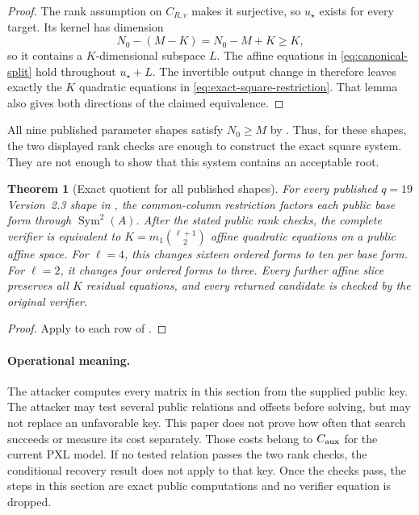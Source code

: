 \documentclass[11pt]{article}
\newtheorem{theorem}{Theorem}[section]
\newcommand{\Sym}{\operatorname{Sym}}
\begin{document}
\begin{proof}
The rank assumption on $C_{R,v}$ makes it surjective, so $u_\star$ exists for
every target.  Its kernel has dimension
\[
  N_0-(M-K)=N_0-M+K\ge K,
\]
so it contains a $K$-dimensional subspace $L$.  The affine equations in
\eqref{eq:canonical-split} hold throughout $u_\star+L$.  The invertible output
change in  therefore leaves exactly the $K$
quadratic equations in \eqref{eq:exact-square-restriction}.  That lemma also
gives both directions of the claimed equivalence.
\end{proof}

All nine published parameter shapes satisfy $N_0\ge M$ by
.  Thus, for these shapes, the two displayed rank checks
are enough to construct the exact square system.  They are not enough to show
that this system contains an acceptable root.

\begin{theorem}[Exact quotient for all published shapes]
\label{thm:exact-all-nine}
For every published $q=19$ Version~2.3 shape in , the
common-column restriction factors each public base form through
$\Sym^2(A)$.  After the stated public rank checks, the complete verifier is
equivalent to $K=m_1\binom{\ell+1}{2}$ affine quadratic equations on a public
affine space.  For $\ell=4$, this changes sixteen ordered forms to ten per
base form.  For $\ell=2$, it changes four ordered forms to three.  Every
further affine slice preserves all $K$ residual equations, and every returned
candidate is checked by the original verifier.
\end{theorem}

\begin{proof}
Apply 
to each row of .
\end{proof}

\paragraph{Operational meaning.}
The attacker computes every matrix in this section from the supplied public
key.  The attacker may test several public relations and offsets before
solving, but may not replace an unfavorable key.  This paper does not prove
how often that search succeeds or measure its cost separately.  Those costs
belong to $C_{\rm aux}$ for the current PXL model.  If no tested relation
passes the two rank checks, the conditional recovery result does not apply to
that key.  Once the checks pass, the steps in this section are exact public
computations and no verifier equation is dropped.
\end{document}
